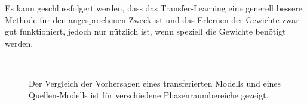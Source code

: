Es kann geschlussfolgert werden, dass das Transfer-Learning eine generell bessere Methode für den angesprochenen Zweck ist und das Erlernen der Gewichte zwar gut funktioniert, jedoch nur nützlich ist, wenn speziell die Gewichte benötigt werden.
\begin{figure}[hb!]
	\centering
	 \\
	\caption{Der Vergleich der Vorhersagen eines transferierten Modells und eines Quellen-Modells ist für verschiedene Phasenraumbereiche gezeigt.}
	\label{Vgl-transfer-not-rw}
\end{figure}
